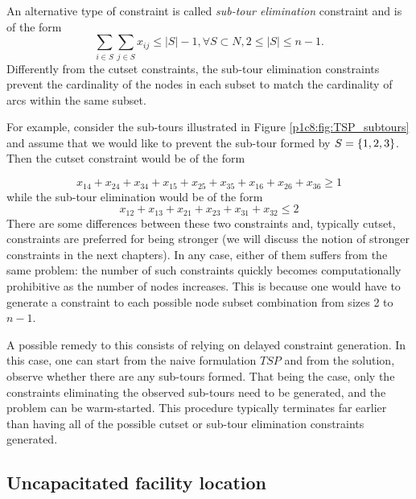 An alternative type of constraint is called \emph{sub-tour elimination} constraint and is of the form
%
\begin{equation*}
	\sum_{i \in S}\sum_{j \in S}x_{ij} \leq |S|-1, \forall S \subset N, 2 \leq |S| \leq n-1. 
\end{equation*}
%
Differently from the cutset constraints, the sub-tour elimination constraints prevent the cardinality of the nodes in each subset to match the cardinality of arcs within the same subset.

For example, consider the sub-tours illustrated in Figure \ref{p1c8:fig:TSP_subtours} and assume that we would like to prevent the sub-tour formed by $S = \left\{ 1,2,3 \right \}$. Then the cutset constraint would be of the form

\begin{equation*}
	x_{14} + x_{24} + x_{34} + x_{15} + x_{25} + x_{35} + x_{16} + x_{26} + x_{36}\geq 1	
\end{equation*}
%
while the sub-tour elimination would be of the form
\begin{equation*}
	x_{12} + x_{13} + x_{21} + x_{23} + x_{31} + x_{32} \leq 2
\end{equation*}
%
There are some differences between these two constraints and, typically cutset, constraints are preferred for being stronger (we will discuss the notion of stronger constraints in the next chapters). In any case, either of them suffers from the same problem: the number of such constraints quickly becomes computationally prohibitive as the number of nodes increases. This is because one would have to generate a constraint to each possible node subset combination from sizes 2 to $n-1$. 

A possible remedy to this consists of relying on delayed constraint generation. In this case, one can start from the naive formulation $TSP$ and from the solution, observe whether there are any sub-tours formed. That being the case, only the constraints eliminating the observed sub-tours need to be generated, and the problem can be warm-started. This procedure typically terminates far earlier than having all of the possible cutset or sub-tour elimination constraints generated. 


\subsection{Uncapacitated facility location}

